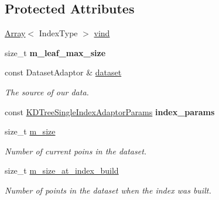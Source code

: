 \subsection*{Protected Attributes}
\begin{DoxyCompactItemize}
\item 
\hyperlink{classArray}{Array}$<$ Index\+Type $>$ \hyperlink{classSph_1_1KDTreeSingleIndexAdaptor_a0a716f1a65f2d3f7984e8de05abae9ad}{vind}
\item 
\hypertarget{classSph_1_1KDTreeSingleIndexAdaptor_aee1c62c8fb9ccf4cd1f42984f32d6f7d}{}\label{classSph_1_1KDTreeSingleIndexAdaptor_aee1c62c8fb9ccf4cd1f42984f32d6f7d} 
size\+\_\+t {\bfseries m\+\_\+leaf\+\_\+max\+\_\+size}
\item 
const Dataset\+Adaptor \& \hyperlink{classSph_1_1KDTreeSingleIndexAdaptor_a4237e355ab2fc9487e0deb5bb96ad127}{dataset}
\begin{DoxyCompactList}\small\item\em The source of our data. \end{DoxyCompactList}\item 
\hypertarget{classSph_1_1KDTreeSingleIndexAdaptor_a194cf5399f404e46b10493481ee8b96c}{}\label{classSph_1_1KDTreeSingleIndexAdaptor_a194cf5399f404e46b10493481ee8b96c} 
const \hyperlink{structSph_1_1KDTreeSingleIndexAdaptorParams}{K\+D\+Tree\+Single\+Index\+Adaptor\+Params} {\bfseries index\+\_\+params}
\item 
\hypertarget{classSph_1_1KDTreeSingleIndexAdaptor_aa387d0a3ea9b0cff67c25acb488730a9}{}\label{classSph_1_1KDTreeSingleIndexAdaptor_aa387d0a3ea9b0cff67c25acb488730a9} 
size\+\_\+t \hyperlink{classSph_1_1KDTreeSingleIndexAdaptor_aa387d0a3ea9b0cff67c25acb488730a9}{m\+\_\+size}
\begin{DoxyCompactList}\small\item\em Number of current poins in the dataset. \end{DoxyCompactList}\item 
\hypertarget{classSph_1_1KDTreeSingleIndexAdaptor_aa6e68610be4a5763b02e36c77776543c}{}\label{classSph_1_1KDTreeSingleIndexAdaptor_aa6e68610be4a5763b02e36c77776543c} 
size\+\_\+t \hyperlink{classSph_1_1KDTreeSingleIndexAdaptor_aa6e68610be4a5763b02e36c77776543c}{m\+\_\+size\+\_\+at\+\_\+index\+\_\+build}
\begin{DoxyCompactList}\small\item\em Number of points in the dataset when the index was built. \end{DoxyCompactList}\item 

\end{DoxyCompactItemize}
